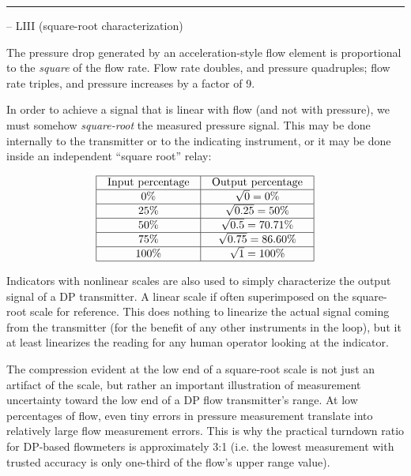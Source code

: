 \filbreak \vskip 5pt \hrule \vskip 5pt  -- LIII (square-root characterization) \vskip 10pt

The pressure drop generated by an acceleration-style flow element is proportional to the {\it square} of the flow rate.  Flow rate doubles, and pressure quadruples; flow rate triples, and pressure increases by a factor of 9.

\vskip 10pt

In order to achieve a signal that is linear with flow (and not with pressure), we must somehow {\it square-root} the measured pressure signal.  This may be done internally to the transmitter or to the indicating instrument, or it may be done inside an independent ``square root'' relay:


$$\vbox{\offinterlineskip
\halign{\strut
\vrule \quad\hfil # \ \hfil & 
\vrule \quad\hfil # \ \hfil \vrule \cr
\noalign{\hrule}
%
Input percentage & Output percentage \cr
%
\noalign{\hrule}
%
0\% & $\sqrt{0} = 0\%$ \cr
%
\noalign{\hrule}
%
25\% & $\sqrt{0.25} = 50\%$ \cr
%
\noalign{\hrule}
%
50\% & $\sqrt{0.5} = 70.71\%$ \cr
%
\noalign{\hrule}
%
75\% & $\sqrt{0.75} = 86.60\%$ \cr
%
\noalign{\hrule}
%
100\% & $\sqrt{1} = 100\%$ \cr
%
\noalign{\hrule}
} %
}$$ %

\vskip 10pt

Indicators with nonlinear scales are also used to simply characterize the output signal of a DP transmitter.  A linear scale if often superimposed on the square-root scale for reference.  This does nothing to linearize the actual signal coming from the transmitter (for the benefit of any other instruments in the loop), but it at least linearizes the reading for any human operator looking at the indicator.

\vskip 10pt

The compression evident at the low end of a square-root scale is not just an artifact of the scale, but rather an important illustration of measurement uncertainty toward the low end of a DP flow transmitter's range.  At low percentages of flow, even tiny errors in pressure measurement translate into relatively large flow measurement errors.  This is why the practical turndown ratio for DP-based flowmeters is approximately 3:1 (i.e. the lowest measurement with trusted accuracy is only one-third of the flow's upper range value).


